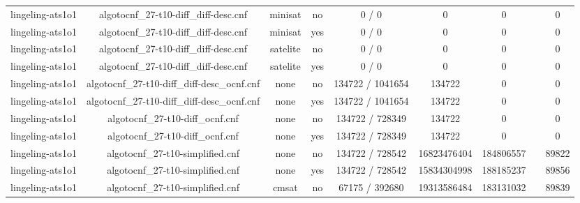 \begin{appendices}
\begin{table}[p]
\begin{center}
\begin{tabular}{l|cccccccc}
  lingeling-ats1o1               & algotocnf\_27-t10-diff\_diff-desc.cnf & minisat    & no    & 0 / 0      & 0         & 0         &            & 0 \\ %
  lingeling-ats1o1               & algotocnf\_27-t10-diff\_diff-desc.cnf & minisat    & yes   & 0 / 0      & 0         & 0         &            & 0 \\ %
  lingeling-ats1o1               & algotocnf\_27-t10-diff\_diff-desc.cnf & satelite   & no    & 0 / 0      & 0         & 0         &            & 0 \\ %
  lingeling-ats1o1               & algotocnf\_27-t10-diff\_diff-desc.cnf & satelite   & yes   & 0 / 0      & 0         & 0         &            & 0 \\ %
  lingeling-ats1o1               & algotocnf\_27-t10-diff\_diff-desc\_ocnf.cnf & none       & no    & 134722 / 1041654 & 134722    & 0         &            & 0 \\ %
  lingeling-ats1o1               & algotocnf\_27-t10-diff\_diff-desc\_ocnf.cnf & none       & yes   & 134722 / 1041654 & 134722    & 0         &            & 0 \\ %
  lingeling-ats1o1               & algotocnf\_27-t10-diff\_ocnf.cnf & none       & no    & 134722 / 728349 & 134722    & 0         &            & 0 \\ %
  lingeling-ats1o1               & algotocnf\_27-t10-diff\_ocnf.cnf & none       & yes   & 134722 / 728349 & 134722    & 0         &            & 0 \\ %
  lingeling-ats1o1               & algotocnf\_27-t10-simplified.cnf & none       & no    & 134722 / 728542 & 16823476404 & 184806557 &            & 89822 \\ %
  lingeling-ats1o1               & algotocnf\_27-t10-simplified.cnf & none       & yes   & 134722 / 728542 & 15834304998 & 188185237 &            & 89856 \\ %
  lingeling-ats1o1               & algotocnf\_27-t10-simplified.cnf & cmsat      & no    & 67175 / 392680 & 19313586484 & 183131032 &            & 89839 \\ %

\end{tabular}
\end{center}
\end{table}
\end{appendices}
